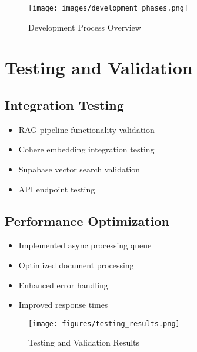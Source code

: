 \begin{figure}[H]
    \centering
    \texttt{[image: images/development\_phases.png]}
    \caption{Development Process Overview}
\end{figure}

\section{Testing and Validation}
\subsection{Integration Testing}
\begin{itemize}
    \item RAG pipeline functionality validation
    \item Cohere embedding integration testing
    \item Supabase vector search validation
    \item API endpoint testing
\end{itemize}

\subsection{Performance Optimization}
\begin{itemize}
    \item Implemented async processing queue
    \item Optimized document processing
    \item Enhanced error handling
    \item Improved response times
\end{itemize}

\begin{figure}[H]
    \centering
    \texttt{[image: figures/testing\_results.png]}
    \caption{Testing and Validation Results}
\end{figure} 